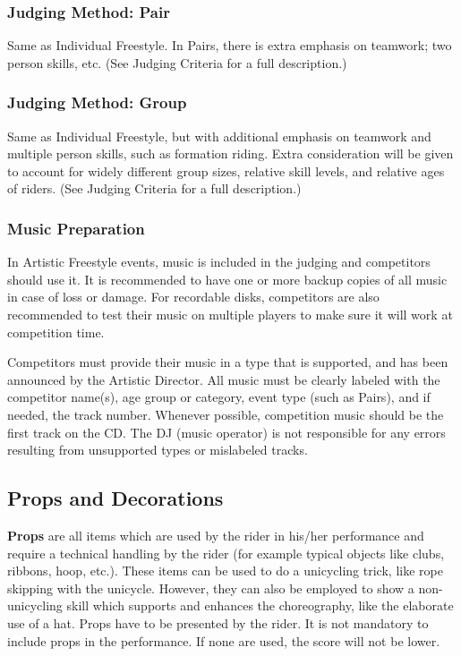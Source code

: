 \subsubsection{Judging Method: Pair}
Same as Individual Freestyle.
In Pairs, there is extra emphasis on teamwork; two person skills, etc.
(See Judging Criteria for a full description.)

\subsubsection{Judging Method: Group}
Same as Individual Freestyle, but with additional emphasis on teamwork and multiple person skills, such as formation riding.
Extra consideration will be given to account for widely different group sizes, relative skill levels, and relative ages of riders.
(See Judging Criteria for a full description.)

\subsubsection{Music Preparation}
\label{sec:freestyle_music}
In Artistic Freestyle events, music is included in the judging and competitors should use it.
It is recommended to have one or more backup copies of all music in case of loss or damage.
For recordable disks, competitors are also recommended to test their music on multiple players to make sure it will work at competition time.

Competitors must provide their music in a type that is supported, and has been announced by the Artistic Director.
All music must be clearly labeled with the competitor name(s), age group or category, event type (such as Pairs), and if needed, the track number.
Whenever possible, competition music should be the first track on the CD.
The DJ (music operator) is not responsible for any errors resulting from unsupported types or mislabeled tracks.

\subsection{Props and Decorations \label{subsec:freestyle_freestyle-rules_individual-freestyle-overview_props-and-decorations}}

\textbf{Props} are all items which are used by the rider in his/her performance and require a technical handling by the rider (for example typical objects like clubs, ribbons, hoop, etc.). 
These items can be used to do a unicycling trick, like rope skipping with the unicycle.
However, they can also be employed to show a non-unicycling skill which supports and enhances the choreography, like the elaborate use of a hat.
Props have to be presented by the rider.
It is not mandatory to include props in the performance.
If none are used, the score will not be lower. 

